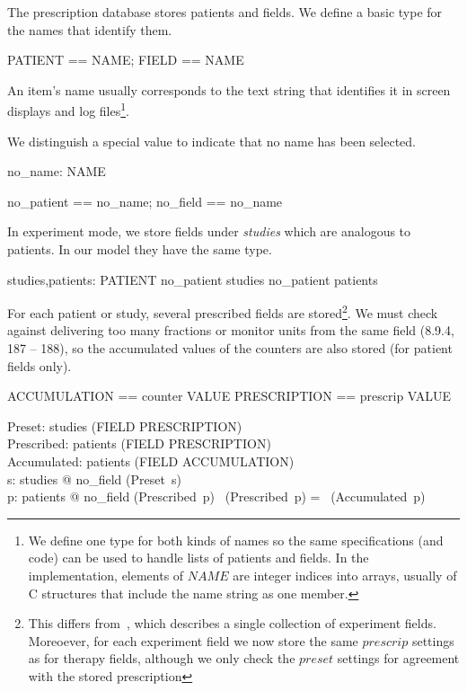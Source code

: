 The prescription database stores patients and fields.  We define a
basic type for the names that identify them.

\begin{zed}
	[NAME]
\also
	PATIENT == NAME; FIELD == NAME
\end{zed}
An item's name usually corresponds to the text string that identifies
it in screen displays and log files\footnote{We define one type for
both kinds of names so the same specifications (and code) can be used
to handle lists of patients and fields.  In the implementation,
elements of $NAME$ are integer indices into arrays, usually of C
structures that include the name string as one member.}.

We distinguish a special value to indicate that no name has been
selected.

\begin{axdef}
	no\_name: NAME \\
\end{axdef}
\begin{zed} no\_patient == no\_name; no\_field == no\_name \end{zed}
In experiment mode, we store fields under {\em studies} which are
analogous to patients.  In our model they have the same type.

\begin{axdef}
	studies,patients: \power PATIENT
\where
	no\_patient \notin studies \land no\_patient \notin patients
\end{axdef}
For each patient or study, several prescribed fields are
stored\footnote{This differs from~\cite{jacky90d}, which describes a
single collection of experiment fields.  Moreoever, for each
experiment field we now store the same $prescrip$ settings as for
therapy fields, although we only check the $preset$ settings for
agreement with the stored prescription}.  We must check against
delivering too many fractions or monitor units from the same field
(8.9.4, 187 -- 188), so the accumulated values of the counters are
also stored (for patient fields only).

\begin{zed}
	ACCUMULATION == counter \fun VALUE
\also
 	PRESCRIPTION == prescrip \fun VALUE
\end{zed}

\begin{axdef}	
	Preset: studies \fun (FIELD \pfun PRESCRIPTION) \\
	Prescribed: patients \fun (FIELD \pfun PRESCRIPTION) \\
	Accumulated: patients \fun (FIELD \pfun ACCUMULATION) \\
\where
	\forall s: studies @ no\_field \notin \dom (Preset~s) \\
	\forall p: patients @ no\_field \notin \dom (Prescribed~p)
			\land \dom~(Prescribed~p) = \dom~(Accumulated~p) 
\end{axdef}

